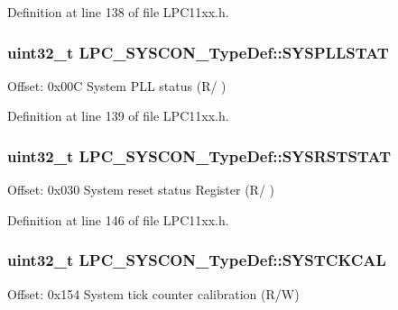 Definition at line 138 of file L\+P\+C11xx.\+h.

\subsubsection[{\texorpdfstring{S\+Y\+S\+P\+L\+L\+S\+T\+AT}{SYSPLLSTAT}}]{ uint32\+\_\+t L\+P\+C\+\_\+\+S\+Y\+S\+C\+O\+N\+\_\+\+Type\+Def\+::\+S\+Y\+S\+P\+L\+L\+S\+T\+AT}\hypertarget{group___l_p_c11xx___definitions_gac3657072d53aa3907b0d49c252c7437f}{}\label{group___l_p_c11xx___definitions_gac3657072d53aa3907b0d49c252c7437f}
Offset\+: 0x00C System P\+LL status (R/ ) 

Definition at line 139 of file L\+P\+C11xx.\+h.

\subsubsection[{\texorpdfstring{S\+Y\+S\+R\+S\+T\+S\+T\+AT}{SYSRSTSTAT}}]{ uint32\+\_\+t L\+P\+C\+\_\+\+S\+Y\+S\+C\+O\+N\+\_\+\+Type\+Def\+::\+S\+Y\+S\+R\+S\+T\+S\+T\+AT}\hypertarget{group___l_p_c11xx___definitions_ga7fff308582edb9f7bfd034d3dcfde524}{}\label{group___l_p_c11xx___definitions_ga7fff308582edb9f7bfd034d3dcfde524}
Offset\+: 0x030 System reset status Register (R/ ) 

Definition at line 146 of file L\+P\+C11xx.\+h.

\subsubsection[{\texorpdfstring{S\+Y\+S\+T\+C\+K\+C\+AL}{SYSTCKCAL}}]{ uint32\+\_\+t L\+P\+C\+\_\+\+S\+Y\+S\+C\+O\+N\+\_\+\+Type\+Def\+::\+S\+Y\+S\+T\+C\+K\+C\+AL}\hypertarget{group___l_p_c11xx___definitions_gaa7900975ba840724314c3994379eb63b}{}\label{group___l_p_c11xx___definitions_gaa7900975ba840724314c3994379eb63b}
Offset\+: 0x154 System tick counter calibration (R/W) 

